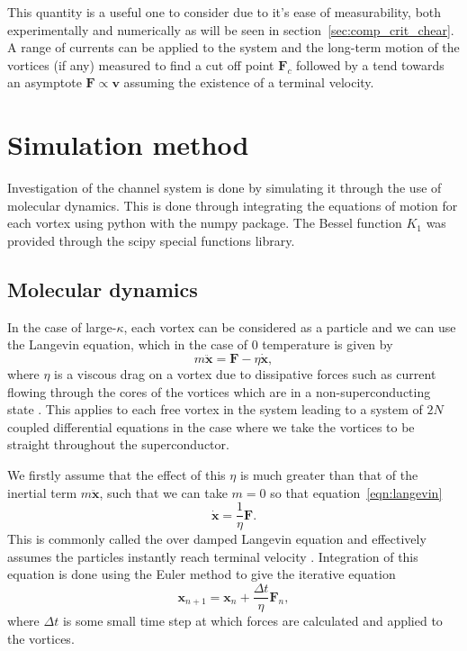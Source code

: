 \documentclass{article}
\numberwithin{equation}{section}
\begin{document}
This quantity is a useful one to consider due to it's ease of measurability, both experimentally and numerically as will be seen in section~\ref{sec:comp_crit_chear}. A range of currents can be applied to the system and the long-term motion of the vortices (if any) measured to find a cut off point $\mathbf{F}_c$ followed by a tend towards an asymptote $\mathbf{F} \propto \mathbf{v}$ assuming the existence of a terminal velocity.

\section{Simulation method}
Investigation of the channel system is done by simulating it through the use of molecular dynamics. This is done through integrating the equations of motion for each vortex using python with the numpy package. The Bessel function $K_1$ was provided through the scipy special functions library.
\subsection{Molecular dynamics}
In the case of large-$\kappa$, each vortex can be considered as a particle and we can use the Langevin equation, which in the case of 0 temperature is given by
\begin{equation}
    m\ddot{\mathbf{x}} = \mathbf{F} - \eta\dot{\mathbf{x}}, \label{eqn:langevin}
\end{equation}
where $\eta$ is a viscous drag on a vortex due to dissipative forces such as current flowing through the cores of the vortices which are in a non-superconducting state \cite{Bardeen1965TheorySuperconductors, Watkins2016DensitySuperconductors}. This applies to each free vortex in the system leading to a system of $2N$ coupled differential equations in the case where we take the vortices to be straight throughout the superconductor.

We firstly assume that the effect of this $\eta$ is much greater than that of the inertial term $m\ddot{\mathbf{x}}$, such that we can take $m=0$ so that equation~\ref{eqn:langevin}
\begin{equation}
    \dot{\mathbf{x}} = \frac{1}{\eta}\mathbf{F}. \label{eqn:langevin_ovdamp}
\end{equation}
This is commonly called the over damped Langevin equation and effectively assumes the particles instantly reach terminal velocity \cite{Poole2014Superconductivity}.
Integration of this equation is done using the Euler method to give the iterative equation
\begin{equation}
    \mathbf{x}_{n+1} = \mathbf{x}_n + \frac{\Delta t}{\eta}\mathbf{F}_n,
\end{equation}
where $\Delta t$ is some small time step at which forces are calculated and applied to the vortices.
\end{document}

